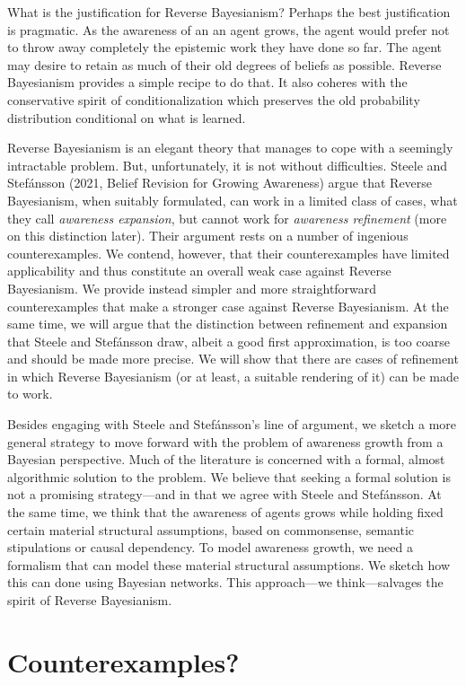 \documentclass[
  11pt,
  dvipsnames,enabledeprecatedfontcommands]{scrartcl}
\begin{document}
What is the justification for Reverse Bayesianism? Perhaps the best
justification is pragmatic. As the awareness of an an agent grows, the
agent would prefer not to throw away completely the epistemic work they
have done so far. The agent may desire to retain as much of their old
degrees of beliefs as possible. Reverse Bayesianism provides a simple
recipe to do that. It also coheres with the conservative spirit of
conditionalization which preserves the old probability distribution
conditional on what is learned.

Reverse Bayesianism is an elegant theory that manages to cope with a
seemingly intractable problem. But, unfortunately, it is not without
difficulties. Steele and Stefánsson (2021, Belief Revision for Growing
Awareness) argue that Reverse Bayesianism, when suitably formulated, can
work in a limited class of cases, what they call
\textit{awareness expansion}, but cannot work for
\textit{awareness refinement} (more on this distinction later). Their
argument rests on a number of ingenious counterexamples. We contend,
however, that their counterexamples have limited applicability and thus
constitute an overall weak case against Reverse Bayesianism. We provide
instead simpler and more straightforward counterexamples that make a
stronger case against Reverse Bayesianism. At the same time, we will
argue that the distinction between refinement and expansion that Steele
and Stefánsson draw, albeit a good first approximation, is too coarse
and should be made more precise. We will show that there are cases of
refinement in which Reverse Bayesianism (or at least, a suitable
rendering of it) can be made to work.

Besides engaging with Steele and Stefánsson's line of argument, we
sketch a more general strategy to move forward with the problem of
awareness growth from a Bayesian perspective. Much of the literature is
concerned with a formal, almost algorithmic solution to the problem. We
believe that seeking a formal solution is not a promising strategy---and
in that we agree with Steele and Stefánsson. At the same time, we think
that the awareness of agents grows while holding fixed certain material
structural assumptions, based on commonsense, semantic stipulations or
causal dependency. To model awareness growth, we need a formalism that
can model these material structural assumptions. We sketch how this can
done using Bayesian networks. This approach---we think---salvages the
spirit of Reverse Bayesianism.

\hypertarget{counterexamples}{%
\section{Counterexamples?}\label{counterexamples}}
\end{document}
